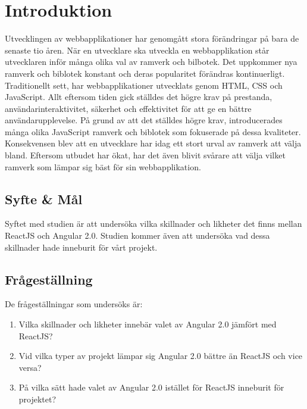 \section{Introduktion}
\label{sec:axel-introduction}
Utvecklingen av webbapplikationer har genomgått stora förändringar på bara de senaste tio åren. När en utvecklare ska utveckla en webbapplikation står utvecklaren inför många olika val av ramverk och bilbotek. Det uppkommer nya ramverk och biblotek konstant och deras popularitet förändras kontinuerligt. Traditionellt sett, har webbapplikationer utvecklats genom HTML, CSS och JavaScript. Allt eftersom tiden gick ställdes det högre krav på prestanda, användarinteraktivitet, säkerhet och effektivitet för att ge en bättre användarupplevelse. På grund av att det ställdes högre krav, introducerades många olika JavaScript ramverk och biblotek som fokuserade på dessa kvaliteter. Konsekvensen 
blev att en utvecklare har idag ett stort urval av ramverk att välja bland. Eftersom utbudet har ökat, har det även blivit svårare att välja vilket ramverk som lämpar sig bäst för sin webbapplikation.

\subsection{Syfte \& Mål}
\label{subsec:motivation}

Syftet med studien är att undersöka vilka skillnader och likheter det finns mellan ReactJS och Angular 2.0. Studien kommer även att undersöka vad dessa skillnader hade inneburit för vårt projekt. 

\subsection{Frågeställning}
\label{subsec:research-questions}

De frågeställningar som undersöks är:

\begin{enumerate}
\item Vilka skillnader och likheter innebär valet av Angular 2.0 jämfört med ReactJS?

\item Vid vilka typer av projekt lämpar sig Angular 2.0 bättre än ReactJS och vice versa?

\item På vilka sätt hade valet av Angular 2.0 istället för ReactJS inneburit för projektet?


\end{enumerate}



